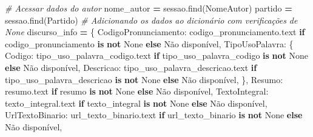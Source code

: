 \documentclass[
]{article}
\newenvironment{Shaded}{\begin{snugshade}}{\end{snugshade}}
\newcommand{\CommentTok}[1]{\textcolor[rgb]{0.56,0.35,0.01}{\textit{#1}}}
\newcommand{\ControlFlowTok}[1]{\textcolor[rgb]{0.13,0.29,0.53}{\textbf{#1}}}
\newcommand{\KeywordTok}[1]{\textcolor[rgb]{0.13,0.29,0.53}{\textbf{#1}}}
\newcommand{\NormalTok}[1]{#1}
\newcommand{\OperatorTok}[1]{\textcolor[rgb]{0.81,0.36,0.00}{\textbf{#1}}}
\newcommand{\StringTok}[1]{\textcolor[rgb]{0.31,0.60,0.02}{#1}}
\newcommand{\VariableTok}[1]{\textcolor[rgb]{0.00,0.00,0.00}{#1}}
\begin{document}
\begin{Shaded}
\begin{Highlighting}[]
                \CommentTok{\# Acessar dados do autor}
\NormalTok{                nome\_autor }\OperatorTok{=}\NormalTok{ sessao.find(}\StringTok{\textquotesingle{}NomeAutor\textquotesingle{}}\NormalTok{)}
\NormalTok{                partido }\OperatorTok{=}\NormalTok{ sessao.find(}\StringTok{\textquotesingle{}Partido\textquotesingle{}}\NormalTok{)}
                \CommentTok{\# Adicionando os dados ao dicionário com verificações de \textquotesingle{}None\textquotesingle{}}
\NormalTok{                discurso\_info }\OperatorTok{=}\NormalTok{ \{}
                    \StringTok{\textquotesingle{}CodigoPronunciamento\textquotesingle{}}\NormalTok{: codigo\_pronunciamento.text }\ControlFlowTok{if}\NormalTok{ codigo\_pronunciamento }\KeywordTok{is} \KeywordTok{not} \VariableTok{None} \ControlFlowTok{else} \StringTok{\textquotesingle{}Não disponível\textquotesingle{}}\NormalTok{,}
                    \StringTok{\textquotesingle{}TipoUsoPalavra\textquotesingle{}}\NormalTok{: \{}
                        \StringTok{\textquotesingle{}Codigo\textquotesingle{}}\NormalTok{: tipo\_uso\_palavra\_codigo.text }\ControlFlowTok{if}\NormalTok{ tipo\_uso\_palavra\_codigo }\KeywordTok{is} \KeywordTok{not} \VariableTok{None} \ControlFlowTok{else} \StringTok{\textquotesingle{}Não disponível\textquotesingle{}}\NormalTok{,}
                        \StringTok{\textquotesingle{}Descricao\textquotesingle{}}\NormalTok{: tipo\_uso\_palavra\_descricao.text }\ControlFlowTok{if}\NormalTok{ tipo\_uso\_palavra\_descricao }\KeywordTok{is} \KeywordTok{not} \VariableTok{None} \ControlFlowTok{else} \StringTok{\textquotesingle{}Não disponível\textquotesingle{}}\NormalTok{,}
\NormalTok{                    \},}
                    \StringTok{\textquotesingle{}Resumo\textquotesingle{}}\NormalTok{: resumo.text }\ControlFlowTok{if}\NormalTok{ resumo }\KeywordTok{is} \KeywordTok{not} \VariableTok{None} \ControlFlowTok{else} \StringTok{\textquotesingle{}Não disponível\textquotesingle{}}\NormalTok{,}
                    \StringTok{\textquotesingle{}TextoIntegral\textquotesingle{}}\NormalTok{: texto\_integral.text }\ControlFlowTok{if}\NormalTok{ texto\_integral }\KeywordTok{is} \KeywordTok{not} \VariableTok{None} \ControlFlowTok{else} \StringTok{\textquotesingle{}Não disponível\textquotesingle{}}\NormalTok{,}
                    \StringTok{\textquotesingle{}UrlTextoBinario\textquotesingle{}}\NormalTok{: url\_texto\_binario.text }\ControlFlowTok{if}\NormalTok{ url\_texto\_binario }\KeywordTok{is} \KeywordTok{not} \VariableTok{None} \ControlFlowTok{else} \StringTok{\textquotesingle{}Não disponível\textquotesingle{}}\NormalTok{,}

\end{Highlighting}
\end{Shaded}
\end{document}
